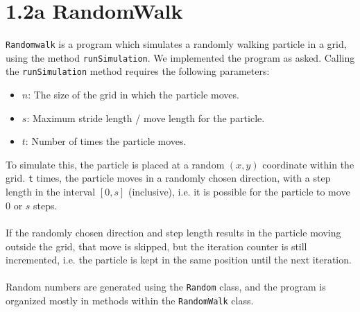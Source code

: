 \section*{1.2a RandomWalk}



    \texttt{Randomwalk} is a program which simulates a randomly walking particle in a grid, using the method \texttt{runSimulation}. We implemented the program as asked. Calling the \texttt{runSimulation} method requires the following parameters:
    \begin{itemize}
        \item $n$: The size of the grid in which the particle moves.
        \item $s$: Maximum stride length / move length for the particle.
        \item $t$: Number of times the particle moves.
    \end{itemize}

    To simulate this, the particle is placed at a random $(x,y)$ coordinate within the grid. \texttt{t} times, the particle moves in a randomly chosen direction, with a step length in the interval $[0,s]$ (inclusive), i.e. it is possible for the particle to move 0 or $s$ steps. \\
    \\
    If the randomly chosen direction and step length results in the particle moving outside the grid, that move is skipped, but the iteration counter is still incremented, i.e. the particle is kept in the same position until the next iteration.\\
    \\
    Random numbers are generated using the \texttt{Random} class, and the program is organized mostly in methods within the \texttt{RandomWalk} class.